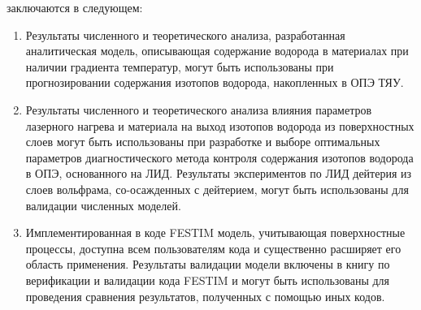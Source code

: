 {\influence} заключаются в следующем:
\begin{enumerate}[beginpenalty=10000] %
    \item Результаты численного и теоретического анализа, разработанная аналитическая модель, описывающая содержание водорода в материалах при наличии градиента температур, могут быть использованы при прогнозировании содержания изотопов водорода, накопленных в ОПЭ ТЯУ.
    \item Результаты численного и теоретического анализа влияния параметров лазерного нагрева и материала на выход изотопов водорода из поверхностных слоев могут быть использованы при разработке и выборе оптимальных параметров диагностического метода контроля содержания изотопов водорода в ОПЭ, основанного на ЛИД.      Результаты экспериментов по ЛИД дейтерия из слоев вольфрама, со-осажденных с дейтерием, могут быть использованы для валидации численных моделей.
    \item Имплементированная в коде FESTIM модель, учитывающая поверхностные процессы, доступна всем пользователям кода и существенно расширяет его область применения. Результаты валидации модели включены в книгу по верификации и валидации кода FESTIM и могут быть использованы для проведения сравнения результатов, полученных с помощью иных кодов.
\end{enumerate}

